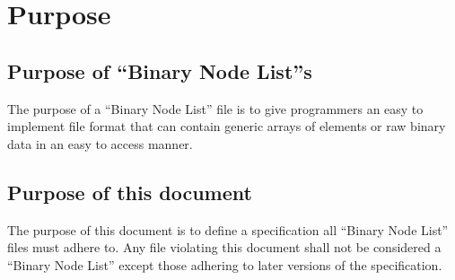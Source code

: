 \section {Purpose}

\subsection {Purpose of ``Binary Node List''s}
The purpose of a ``Binary Node List'' file is to give programmers an easy to
implement file format that can contain generic arrays of elements or raw binary
data in an easy to access manner.

\subsection {Purpose of this document}
The purpose of this document is to define a specification all ``Binary Node 
List'' files must adhere to. Any file violating this document shall not be
considered a ``Binary Node List'' except those adhering to later versions of
the specification.
